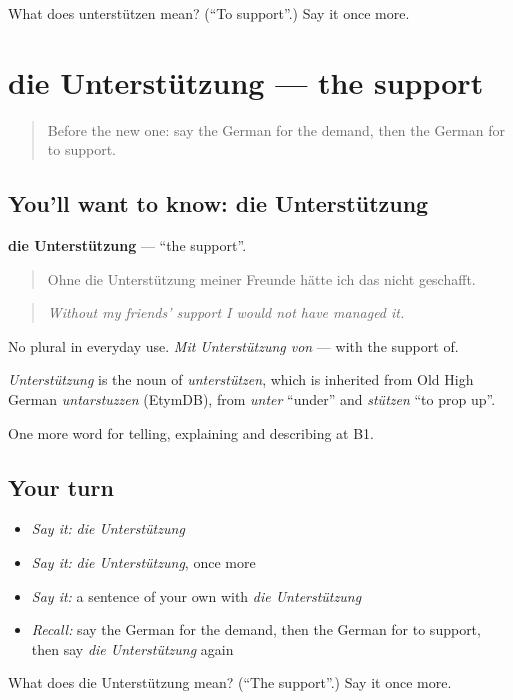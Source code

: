 \begin{tcolorbox}[breakable,colback=teal!4,colframe=teal!35!black,title={Before you move on}]
What does unterstützen mean? (\textquotedblleft{}To support\textquotedblright{}.) Say it once more.
\end{tcolorbox}
\section[die Unterstützung]{die Unterstützung — the support}

\label{lesson:GE-C357-unterstuetzung}



\begin{quote}
Before the new one: say the German for the demand, then the German for to support.
\end{quote}

\subsection*{You'll want to know: die Unterstützung}
\textbf{die Unterstützung} — \textquotedblleft{}the support\textquotedblright{}.

\begin{quote}
Ohne die Unterstützung meiner Freunde hätte ich das nicht geschafft.
\end{quote}

\begin{quote}
\emph{Without my friends' support I would not have managed it.}
\end{quote}

No plural in everyday use. \emph{Mit Unterstützung von} — with the support of.

\begin{cousinweb}
\emph{Unterstützung} is the noun of \emph{unterstützen}, which is inherited from Old High German \emph{untarstuzzen} (EtymDB), from \emph{unter} \textquotedblleft{}under\textquotedblright{} and \emph{stützen} \textquotedblleft{}to prop up\textquotedblright{}.
\end{cousinweb}

\begin{grammarlens}[title={What you've built}]
One more word for telling, explaining and describing at B1.
\end{grammarlens}

\subsection*{Your turn}
\begin{itemize}
\raggedright
  \item \emph{Say it:} \emph{die Unterstützung}
  \item \emph{Say it:} \emph{die Unterstützung}, once more
  \item \emph{Say it:} a sentence of your own with \emph{die Unterstützung}
  \item \emph{Recall:} say the German for the demand, then the German for to support, then say \emph{die Unterstützung} again
\end{itemize}

\begin{tcolorbox}[breakable,colback=teal!4,colframe=teal!35!black,title={Before you move on}]
What does die Unterstützung mean? (\textquotedblleft{}The support\textquotedblright{}.) Say it once more.
\end{tcolorbox}
